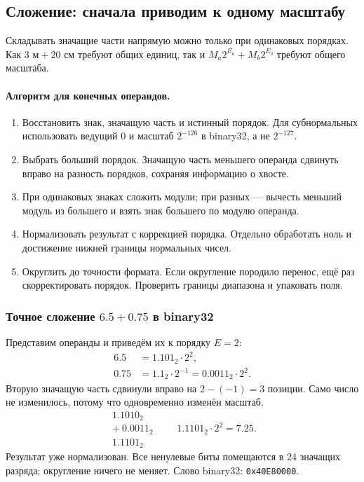 \subsection{Сложение: сначала приводим к одному масштабу}
Складывать значащие части напрямую можно только при одинаковых порядках.
Как $3\text{ м}+20\text{ см}$ требуют общих единиц, так и
$M_a2^{E_a}+M_b2^{E_b}$ требуют общего масштаба.

\paragraph{Алгоритм для конечных операндов.}
\begin{enumerate}
    \item Восстановить знак, значащую часть и истинный порядок.
    Для субнормальных использовать ведущий 0 и масштаб $2^{-126}$
    в binary32, а не $2^{-127}$.
    \item Выбрать больший порядок. Значащую часть меньшего операнда
    сдвинуть вправо на разность порядков, сохраняя информацию о хвосте.
    \item При одинаковых знаках сложить модули; при разных --- вычесть
    меньший модуль из большего и взять знак большего по модулю операнда.
    \item Нормализовать результат с коррекцией порядка. Отдельно
    обработать ноль и достижение нижней границы нормальных чисел.
    \item Округлить до точности формата. Если округление породило перенос,
    ещё раз скорректировать порядок. Проверить границы диапазона и упаковать поля.
\end{enumerate}

\subsubsection*{Точное сложение $6.5+0.75$ в binary32}
Представим операнды и приведём их к порядку $E=2$:
\[
\begin{aligned}
6.5 &= 1.101_2\cdot2^2,\\
0.75 &= 1.1_2\cdot2^{-1}=0.0011_2\cdot2^2.
\end{aligned}
\]
Вторую значащую часть сдвинули вправо на $2-(-1)=3$ позиции.
Само число не изменилось, потому что одновременно изменён масштаб.
\[
\begin{array}{r}
1.1010_2\\
+\ 0.0011_2\\
\hline
1.1101_2
\end{array}
\qquad
1.1101_2\cdot2^2=7.25.
\]
Результат уже нормализован. Все ненулевые биты помещаются в 24 значащих
разряда; округление ничего не меняет. Слово binary32: \texttt{0x40E80000}.

